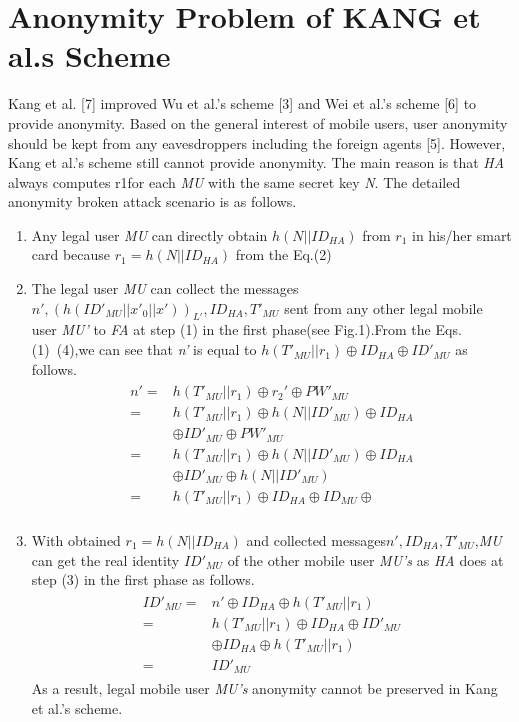 \documentclass[letter]{ieice}%
\begin{document}
\section{Anonymity Problem of KANG et al.s Scheme}
\noindent Kang et al. [7] improved Wu et al.’s scheme [3] and Wei et al.’s scheme [6] to provide anonymity. Based on the general interest of mobile users, user anonymity should be kept from any eavesdroppers including the foreign agents [5]. However, Kang et al.’s scheme still cannot provide anonymity. The main reason is that \emph{HA} always computes r1for each \emph{MU} with the same secret key \emph{N}. The detailed anonymity broken attack scenario is as follows.
\begin{enumerate}
\item Any legal user \emph{MU} can directly obtain $h(N||{ID}_{HA})$ from $r_1$ in his/her smart card because $r_1=h(N||{ID}_{HA})$ from the Eq.(2)
\item The legal user \emph{MU} can collect the messages ${n',(h({ID'}_{MU}||{x'}_0||x'))_{L'}},{ID}_{HA},T'_{MU}$ sent from any other legal mobile user \emph{MU'} to \emph{FA} at step (1) in the first phase(see Fig.1).From the Eqs.(1)~(4),we can see that \emph{n'} is equal to $h({T'}_{MU} ||r_1)\oplus {ID}_{HA}\oplus {ID'}_{MU}$ as follows.
\begin{eqnarray}
\begin{split}
n'=&h(T'_{MU}||r_1)\oplus {r_2}'\oplus PW'_{MU}\\
=&h(T'_{MU}||r_1)\oplus h(N||ID'_{MU})\oplus ID_{HA}\\
&\oplus ID'_{MU} \oplus PW'_{MU}\\
=&h(T'_{MU}||r_1)\oplus h(N||ID'_{MU})\oplus ID_{HA}\\
&\oplus ID'_{MU} \oplus h(N||ID'_{MU})\\
=&h(T'_{MU}||r_1)\oplus ID_{HA}\oplus ID_{MU}\oplus\\
\end{split}
\end{eqnarray}
\item With obtained $r_1=h(N||{ID}_{HA})$ and collected messages${n',{ID}_{HA},T'_{MU}}$,\emph{MU} can get the real identity ${ID'}_{MU}$ of the other mobile user \emph{MU's} as \emph{HA} does at step (3) in the first phase as follows.
\begin{eqnarray}%
\begin{split}
ID'_{MU}=&n'\oplus ID_{HA} \oplus h(T'_{MU}||r_1)\\
=&h(T'_{MU}||r_1)\oplus ID_{HA}\oplus ID'_{MU}\\
&\oplus ID_{HA} \oplus h(T'_{MU}||r_1)\\
=&ID'_{MU}
\end{split}
\end{eqnarray}
As a result, legal mobile user \emph{MU’s} anonymity cannot be preserved in Kang et al.’s scheme.
\end{enumerate}
\end{document}
